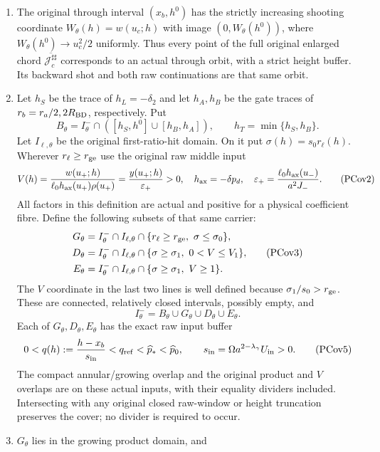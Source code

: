 \begin{proposition}
\begin{enumerate}
\item The original through interval $(x_b,h^0)$ has the strictly increasing
shooting coordinate $W_\theta(h)=w(u_c;h)$ with image
$(0,W_\theta(h^0))$, where $W_\theta(h^0)\to u_c^2/2$ uniformly.
Thus every point of the full original enlarged chord
$\overline{\mathcal J_c^{\sharp\sharp}}$ corresponds to an actual through orbit,
with a strict height buffer. Its backward shot and both raw continuations
are that same orbit.
\item Let $h_S$ be the trace of $h_L=-\delta_2$ and let $h_A,h_B$
be the gate traces of $r_b=r_a/2,2R_{\rm BD}$, respectively. Put
\[
 B_\theta=I_\theta^-\cap([h_S,h^0]\cup[h_B,h_A]),\qquad
 h_T=\min\{h_S,h_B\}.
 \tag{PCov1}
\]
Let $I_{\ell,\theta}$ be the original first-ratio-hit domain. On it put
$\sigma(h)=s_0r_\ell(h)$. Wherever $r_\ell\ge r_{\rm ge}$ use
the original raw middle input
\[
 V(h)=\frac{w(u_+;h)}{\ell_0h_{\rm ax}(u_+)\rho(u_+)}
     =\frac{y(u_+;h)}{\varepsilon_+}>0,
 \quad h_{\rm ax}=-\delta p_d,\quad
 \varepsilon_+=\frac{\ell_0h_{\rm ax}(u_-)}{a^2J_-}.
 \tag{PCov2}
\]
All factors in this definition are actual and positive for a physical
coefficient fibre. Define the following subsets of that same carrier:
\[
\begin{aligned}
 G_\theta&=I_\theta^-\cap I_{\ell,\theta}
          \cap\{r_\ell\ge r_{\rm ge},\ \sigma\le\sigma_0\},\\
 D_\theta&=I_\theta^-\cap I_{\ell,\theta}
          \cap\{\sigma\ge\sigma_1,\ 0<V\le V_1\},\\
 E_\theta&=I_\theta^-\cap I_{\ell,\theta}
          \cap\{\sigma\ge\sigma_1,\ V\ge1\}.
\end{aligned}                                                    \tag{PCov3}
\]
The $V$ coordinate in the last two lines is well defined because
$\sigma_1/s_0>r_{\rm ge}$. These are connected, relatively closed
intervals, possibly empty, and
\[
 I_\theta^-=B_\theta\cup G_\theta\cup D_\theta\cup E_\theta.
 \tag{PCov4}
\]
Each of $G_\theta,D_\theta,E_\theta$ has the exact raw input buffer
\[
 0<q(h):=\frac{h-x_b}{s_{\rm in}}<q_{\rm ref}
       <\widehat p_*<\widehat p_0,
 \qquad s_{\rm in}=\Omega a^{2-\lambda_\gamma}U_{\rm in}>0.
 \tag{PCov5}
\]
The compact annular/growing overlap and the original product and
$V$ overlaps are on these actual inputs, with their equality dividers
included. Intersecting with any original closed raw-window or height
truncation preserves the cover; no divider is required to occur.
\item $G_\theta$ lies in the growing product domain, and

\end{enumerate}
\end{proposition}
